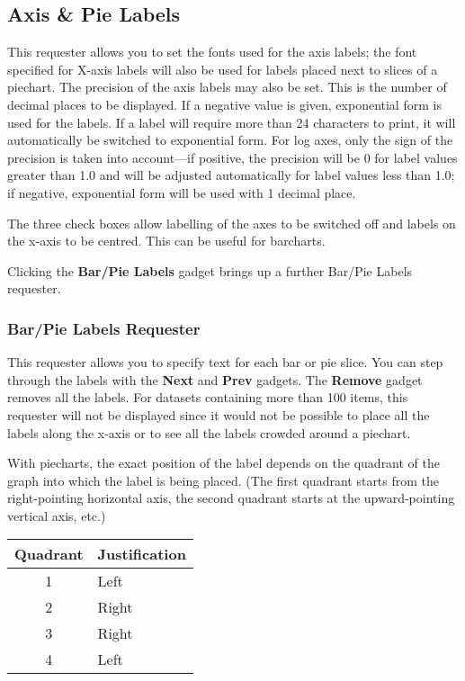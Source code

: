 \documentclass{report}
\begin{document}
\subsection{Axis \& Pie Labels}
This requester allows you to set the fonts used for the axis labels;
the font specified for X-axis labels will also be used for labels placed next 
to slices of a piechart. 
The precision of the axis labels may also be set. This is the number of decimal 
places to be displayed. If a negative value is given, exponential form is used for 
the labels. If a label will require more than 24 characters to print, it will 
automatically be switched to exponential form. For log axes, only the sign of the 
precision is taken into account---if positive, the precision will be 0 for label 
values greater than 1.0 and will be adjusted automatically for label values less 
than 1.0; if negative, exponential form will be used with 1 decimal place.

The three check boxes allow labelling of the axes to be switched off and labels 
on the x-axis to be centred. This can be useful for barcharts.

Clicking the {\bf Bar/Pie Labels} gadget brings up a further Bar/Pie Labels requester.

\subsubsection{Bar/Pie Labels Requester}
\label{ss:bplab}
This requester allows you to specify text for each bar or pie slice. You 
can step through the labels with the {\bf Next} and {\bf Prev} gadgets. The 
{\bf Remove} gadget removes all the labels. For datasets containing more than 100 
items, this requester 
will not be displayed since it would not be possible to place all the 
labels along the x-axis or to see all the labels crowded around a piechart.

With piecharts, the exact position of the label depends on the quadrant of the graph 
into which the label is being placed. (The first quadrant starts from the 
right-pointing horizontal axis, the second quadrant starts at the upward-pointing 
vertical axis, etc.)

\begin{center}
\begin{tabular}{|c|l|}\hline
Quadrant & Justification   \\ \hline
1        & Left            \\
2        & Right           \\
3        & Right           \\
4        & Left            \\ \hline
\end{tabular}
\end{center}
\end{document}
